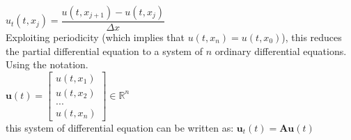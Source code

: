 \documentclass[14pt,a4paper]{article}
\begin{document}
\hspace*{4cm} $u_t(t,x_j) = \dfrac{u(t,x_{j+1}) - u(t,x_j)}{\Delta x}$\\
Exploiting periodicity (which implies that $u(t,x_n) = u(t,x_0)$), this reduces the partial differential equation to a system of $n$ ordinary differential equations. Using the notation.\\
\hspace*{5cm} $\textbf{u}(t) = \begin{bmatrix} u(t,x_1)\\ u(t,x_2) \\ ... \\ u(t,x_n) \end{bmatrix} \in \mathbb{R}^n$ \\
this system of differential equation can be written as: $\textbf{u}_t(t) = \textbf{Au}(t)$
\end{document}
